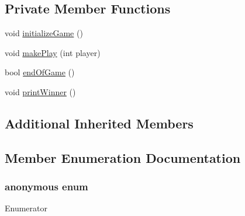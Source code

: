 \subsection*{Private Member Functions}
\begin{DoxyCompactItemize}
\item 
void \hyperlink{classwikibooks__design__patterns_1_1Chess_ab90b8fa2a95ad530b286d0c991ee85b7}{initialize\+Game} ()
\item 
void \hyperlink{classwikibooks__design__patterns_1_1Chess_ac0c6d94fab2c7f8ca8995591a3b688ed}{make\+Play} (int player)
\item 
bool \hyperlink{classwikibooks__design__patterns_1_1Chess_a7722fa3719cef20836f15b9579dfb8db}{end\+Of\+Game} ()
\item 
void \hyperlink{classwikibooks__design__patterns_1_1Chess_a0a38a15831a76736781e8952eeca43d4}{print\+Winner} ()
\end{DoxyCompactItemize}
\subsection*{Additional Inherited Members}


\subsection{Member Enumeration Documentation}
\subsubsection[{\texorpdfstring{anonymous enum}{anonymous enum}}]{\setlength{\rightskip}{0pt plus 5cm}anonymous enum\hspace{0.3cm}{\ttfamily [private]}}\hypertarget{classwikibooks__design__patterns_1_1Chess_a4dd06f0e46a019fabaa0d06013eda2ec}{}\label{classwikibooks__design__patterns_1_1Chess_a4dd06f0e46a019fabaa0d06013eda2ec}
\begin{Desc}
\item[Enumerator]\par
\begin{description}
\item[{\em 
M\+O\+V\+E\+S\+\_\+\+W\+I\+N\+\_\+\+C\+O\+R\+R\+E\+C\+T\+I\+ON\hypertarget{classwikibooks__design__patterns_1_1Chess_a4dd06f0e46a019fabaa0d06013eda2ecaf2a5dc2ad13559326bb03ee0772d95c0}{}\label{classwikibooks__design__patterns_1_1Chess_a4dd06f0e46a019fabaa0d06013eda2ecaf2a5dc2ad13559326bb03ee0772d95c0}
}]\end{description}
\end{Desc}

